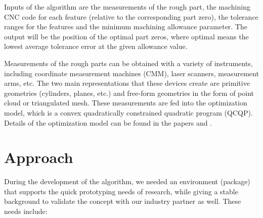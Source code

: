 \documentclass{juliacon}
\begin{document}
Inputs of the algorithm are the measurements of the rough part, the machining CNC code for each feature (relative to the corresponding part zero), the tolerance ranges for the features and the minimum machining allowance parameter.
The output will be the position of the optimal part zeros, where optimal means the lowest average tolerance error at the given allowance value.

Measurements of the rough parts can be obtained with a variety of instruments, including coordinate measurement machines (CMM), laser scanners, measurement arms, etc.
The two main representations that these devices create are primitive geometries (cylinders, planes, etc.) and free-form geometries in the form of point cloud or triangulated mesh.
These measurements are fed into the optimization model, which is a convex quadratically constrained quadratic program (QCQP).
Details of the optimization model can be found in the papers \cite{cserteg:2023_Annals} and \cite{cserteg:2023_CMS}.

\section{Approach}
\label{sec:approach}

During the development of the algorithm, we needed an environment (package) that supports the quick prototyping needs of research, while giving a stable background to validate the concept with our industry partner as well.
These needs include:
\end{document}
